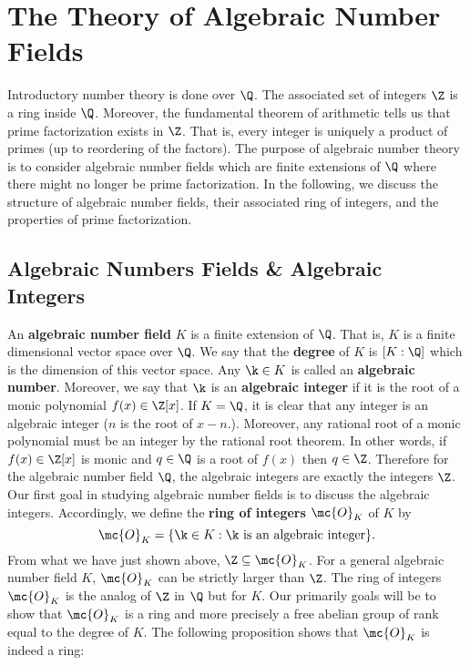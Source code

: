 \chapter{The Theory of Algebraic Number Fields}
  Introductory number theory is done over $\Q$. The associated set of integers $\Z$ is a ring inside $\Q$. Moreover, the fundamental theorem of arithmetic tells us that prime factorization exists in $\Z$. That is, every integer is uniquely a product of primes (up to reordering of the factors). The purpose of algebraic number theory is to consider algebraic number fields which are finite extensions of $\Q$ where there might no longer be prime factorization. In the following, we discuss the structure of algebraic number fields, their associated ring of integers, and the properties of prime factorization.
  \section{Algebraic Numbers Fields \& Algebraic Integers}
    An \textbf{algebraic number field} $K$ is a finite extension of $\Q$. That is, $K$ is a finite dimensional vector space over $\Q$. We say that the \textbf{degree} of $K$ is $[K:\Q]$ which is the dimension of this vector space. Any $\k \in K$ is called an \textbf{algebraic number}. Moreover, we say that $\k$ is an \textbf{algebraic integer} if it is the root of a monic polynomial $f(x) \in \Z[x]$. If $K = \Q$, it is clear that any integer is an algebraic integer ($n$ is the root of $x-n$.). Moreover, any rational root of a monic polynomial must be an integer by the rational root theorem. In other words, if $f(x) \in \Z[x]$ is monic and $q \in \Q$ is a root of $f(x)$ then $q \in \Z$. Therefore for the algebraic number field $\Q$, the algebraic integers are exactly the integers $\Z$. Our first goal in studying algebraic number fields is to discuss the algebraic integers. Accordingly, we define the \textbf{ring of integers} $\mc{O}_{K}$ of $K$ by
    \[
      \mc{O}_{K} = \{\k \in K:\text{$\k$ is an algebraic integer}\}.
    \]
    From what we have just shown above, $\Z \subseteq \mc{O}_{K}$. For a general algebraic number field $K$, $\mc{O}_{K}$ can be strictly larger than $\Z$. The ring of integers $\mc{O}_{K}$ is the analog of $\Z$ in $\Q$ but for $K$. Our primarily goals will be to show that $\mc{O}_{K}$ is a ring and more precisely a free abelian group of rank equal to the degree of $K$. The following proposition shows that $\mc{O}_{K}$ is indeed a ring:

